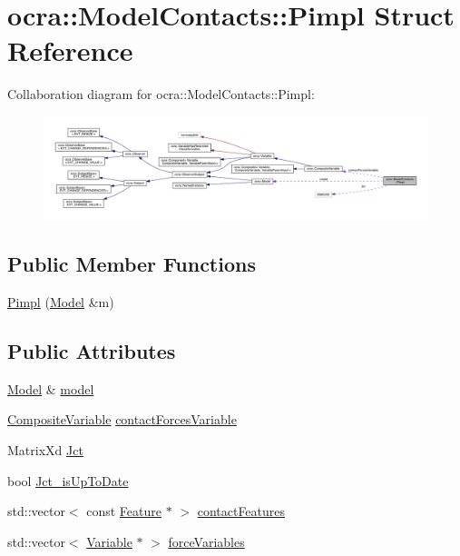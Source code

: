 \hypertarget{structocra_1_1ModelContacts_1_1Pimpl}{}\section{ocra\+:\+:Model\+Contacts\+:\+:Pimpl Struct Reference}
\label{structocra_1_1ModelContacts_1_1Pimpl}


Collaboration diagram for ocra\+:\+:Model\+Contacts\+:\+:Pimpl\+:\nopagebreak
\begin{figure}[H]
\begin{center}
\leavevmode
\includegraphics[width=350pt]{d9/d86/structocra_1_1ModelContacts_1_1Pimpl__coll__graph}
\end{center}
\end{figure}
\subsection*{Public Member Functions}
\begin{DoxyCompactItemize}
\item 
\hyperlink{structocra_1_1ModelContacts_1_1Pimpl_a49e42d553f4cb66b8c6207e63733d410}{Pimpl} (\hyperlink{classocra_1_1Model}{Model} \&m)
\end{DoxyCompactItemize}
\subsection*{Public Attributes}
\begin{DoxyCompactItemize}
\item 
\hyperlink{classocra_1_1Model}{Model} \& \hyperlink{structocra_1_1ModelContacts_1_1Pimpl_a16998d1fe02ccbb3a3f2282d5ddc5074}{model}
\item 
\hyperlink{classocra_1_1CompositeVariable}{Composite\+Variable} \hyperlink{structocra_1_1ModelContacts_1_1Pimpl_a274e86267cd0b9dba8105fda27fda205}{contact\+Forces\+Variable}
\item 
Matrix\+Xd \hyperlink{structocra_1_1ModelContacts_1_1Pimpl_ae11aa9cbd6a04aebd3039556c3da027b}{Jct}
\item 
bool \hyperlink{structocra_1_1ModelContacts_1_1Pimpl_ac0fa66cfb8b54718dd3a03c683819c6d}{Jct\+\_\+is\+Up\+To\+Date}
\item 
std\+::vector$<$ const \hyperlink{classocra_1_1Feature}{Feature} $\ast$ $>$ \hyperlink{structocra_1_1ModelContacts_1_1Pimpl_ac15c6469b805fa54ffb5422a7b1014bd}{contact\+Features}
\item 
std\+::vector$<$ \hyperlink{classocra_1_1Variable}{Variable} $\ast$ $>$ \hyperlink{structocra_1_1ModelContacts_1_1Pimpl_a133837a5c20241ac20b41c0fb7401682}{force\+Variables}
\end{DoxyCompactItemize}


